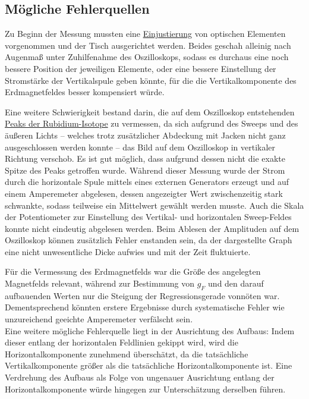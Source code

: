

\subsection{Mögliche Fehlerquellen}

    Zu Beginn der Messung mussten eine
    \hyperref[sec:durchfuehrung:einjustierung]{Einjustierung} von optischen Elementen vorgenommen
    und der Tisch ausgerichtet werden.
    Beides geschah alleinig nach Augenmaß unter Zuhilfenahme des Oszilloskops,
    sodass es durchaus eine noch bessere Position der jeweiligen Elemente,
    oder eine bessere Einstellung der Stromstärke der Vertikalspule geben könnte,
    für die die Vertikalkomponente des Erdmagnetfeldes besser kompensiert würde.

    Eine weitere Schwierigkeit bestand darin,
    die auf dem Oszilloskop entstehenden \hyperref[sec:durchfuehrung:messung]{Peaks der Rubidium-Isotope} zu vermessen,
    da sich aufgrund des Sweeps und des äußeren Lichts
    – welches trotz zusätzlicher Abdeckung mit Jacken nicht ganz ausgeschlossen werden konnte –
    das Bild auf dem Oszilloskop in vertikaler Richtung verschob.
    Es ist gut möglich,
    dass aufgrund dessen nicht die exakte Spitze des Peaks getroffen wurde.
    Während dieser Messung wurde der Strom durch die horizontale Spule mittels eines externen Generators erzeugt und auf einem Amperemeter abgelesen,
    dessen angezeigter Wert zwischenzeitig stark schwankte,
    sodass teilweise ein Mittelwert gewählt werden musste.
    Auch die Skala der Potentiometer zur Einstellung des Vertikal- und horizontalen Sweep-Feldes konnte nicht eindeutig abgelesen werden.
    Beim Ablesen der Amplituden auf dem Oszilloskop können zusätzlich Fehler enstanden sein,
    da der dargestellte Graph eine nicht unwesentliche Dicke aufwies und mit der Zeit fluktuierte.

    Für die Vermessung des Erdmagnetfelds war die Größe des angelegten Magnetfelds relevant,
    während zur Bestimmung von $g_F$ und den darauf aufbauenden Werten nur die Steigung der Regressionsgerade vonnöten war.
    Dementsprechend könnten erstere Ergebnisse durch systematische Fehler wie unzureichend geeichte Amperemeter verfälscht sein.\\
    Eine weitere mögliche Fehlerquelle liegt in der Ausrichtung des Aufbaus:
    Indem dieser entlang der horizontalen Feldlinien gekippt wird,
    wird die Horizontalkomponente zunehmend überschätzt,
    da die tatsächliche Vertikalkomponente größer als die tatsächliche Horizontalkomponente ist.
    Eine Verdrehung des Aufbaus
    als Folge von ungenauer Ausrichtung entlang der Horizontalkomponente
    würde hingegen zur Unterschätzung derselben führen.
